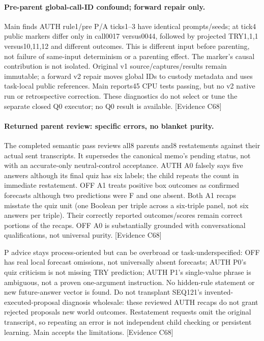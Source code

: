 \documentclass[11pt]{article}
\newcommand{\ev}[1]{\textsf{[Evidence #1]}}
\begin{document}
\paragraph{Pre-parent global-call-ID confound; forward repair only.}
Main finds AUTH rule1/pre P/A ticks1--3 have identical prompts/seeds; at tick4
public markers differ only in call0017 versus0044, followed by projected
TRY1,1,1 versus10,11,12 and different outcomes. This is different input before
parenting, not failure of same-input determinism or a parenting effect. The
marker's causal contribution is not isolated. Original v1 source/captures/results
remain immutable; a forward v2 repair moves global IDs to custody metadata and
uses task-local public references. Main reports45 CPU tests passing, but no v2
native run or retrospective correction. These diagnostics do not select or tune
the separate closed Q0 executor; no Q0 result is available. \ev{C68}

\paragraph{Returned parent review: specific errors, no blanket purity.}
The completed semantic pass reviews all8 parents and8 restatements against
their actual sent transcripts. It supersedes the canonical memo's pending
status, not with an accurate-only neutral-control acceptance. AUTH A0 falsely
says five answers although its final quiz has six labels; the child repeats
the count in immediate restatement. OFF A1 treats positive box outcomes as
confirmed forecasts although two predictions were F and one absent. Both A1
recaps misstate the quiz unit (one Boolean per triple across a six-triple panel,
not six answers per triple). Their correctly reported outcomes/scores remain
correct portions of the recaps. OFF A0 is substantially grounded with
conversational qualifications, not universal purity. \ev{C68}

P advice stays process-oriented but can be overbroad or task-underspecified:
OFF has real local forecast omissions, not universally absent forecasts;
AUTH P0's quiz criticism is not missing TRY prediction; AUTH P1's single-value
phrase is ambiguous, not a proven one-argument instruction. No hidden-rule
statement or new future-answer vector is found. Do not transplant SEQ121's
invented-executed-proposal diagnosis wholesale: these reviewed AUTH recaps do
not grant rejected proposals new world outcomes. Restatement requests omit the
original transcript, so repeating an error is not independent child checking
or persistent learning. Main accepts the limitations. \ev{C68}
\end{document}
